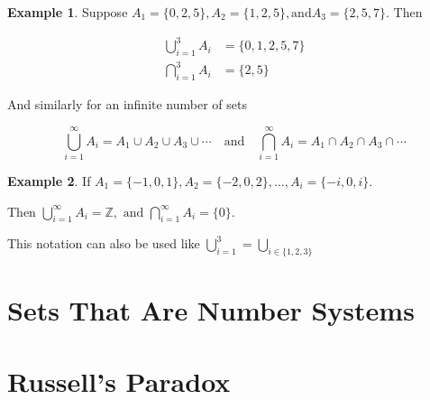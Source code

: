 \documentclass[10pt]{article}
\newcommand{\Z}{\mathbb{Z}}
\theoremstyle{definition}
\newtheorem{example}{Example}
\begin{document}
    \begin{example}
        Suppose $A_1 = \{0,2,5\}, A_2 = \{1,2,5\}, \text{and} A_3 = \{2,5,7\}$. Then

        $$
        \begin{aligned}
            \bigcup_{i=1}^3 A_i &= \{0,1,2,5,7\} \\
            \bigcap_{i=1}^3 A_i &= \{2,5\}
        \end{aligned}
        $$
    \end{example}

    And similarly for an infinite number of sets

    $$
    \bigcup_{i=1}^{\infty} A_i = A_1 \cup A_2 \cup A_3 \cup \cdots \quad \text{and} \quad
    \bigcap_{i=1}^{\infty} A_i = A_1 \cap A_2 \cap A_3 \cap \cdots
    $$

    \begin{example}
        If $A_1 = \{-1,0,1\}, A_2 = \{-2,0,2\}, \dots, A_i = \{-i,0,i\}$.

        Then $\bigcup_{i=1}^{\infty} A_i = \Z, \text{ and } \bigcap_{i=1}^{\infty} A_i = \{0\}$.
    \end{example}

    This notation can also be used like $\bigcup_{i=1}^{3} = \bigcup_{i\in\{1,2,3\}}$

    


    \section{Sets That Are Number Systems}

    \section{Russell's Paradox}

    
\end{document}
